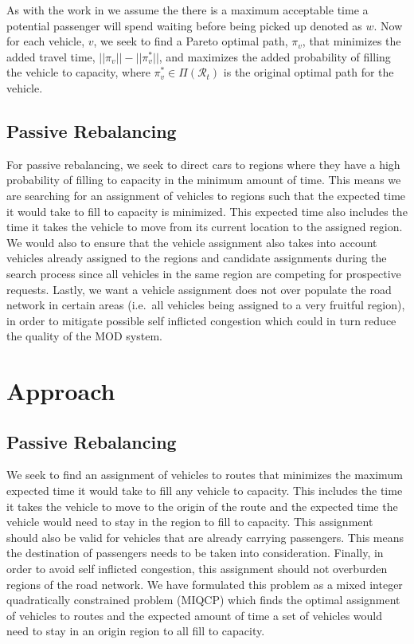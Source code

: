 \documentclass[letterpaper, 10pt, conference]{ieeeconf}
\begin{document}
As with the work in \cite{alonsomora16pnas} we assume the there is a maximum
acceptable time a potential passenger will spend waiting before being picked up
denoted as $w$. Now for each vehicle, $v$, we seek to find a Pareto optimal
path, $\pi_v$, that minimizes the added travel time, $||\pi_v|| - ||\pi_v^*||$,
and maximizes the added probability of filling the vehicle to capacity, where
$\pi_v^* \in \Pi(\mathcal{R}_t)$ is the original optimal path for the vehicle.

\subsection{Passive Rebalancing}

For passive rebalancing, we seek to direct cars to regions where they have a
high probability of filling to capacity in the minimum amount of time. This
means we are searching for an assignment of vehicles to regions such that the
expected time it would take to fill to capacity is minimized. This expected
time also includes the time it takes the vehicle to move from its current
location to the assigned region. We would also to ensure that the vehicle
assignment also takes into account vehicles already assigned to the regions and
candidate assignments during the search process since all vehicles in the same
region are competing for prospective requests. Lastly, we want a vehicle
assignment does not over populate the road network in certain areas (i.e.\ all
vehicles being assigned to a very fruitful region), in order to mitigate
possible self inflicted congestion which could in turn reduce the quality of
the MOD system.

\section{Approach}

\subsection{Passive Rebalancing}

We seek to find an assignment of vehicles to routes that minimizes the maximum
expected time it would take to fill any vehicle to capacity. This includes the
time it takes the vehicle to move to the origin of the route and the expected
time the vehicle would need to stay in the region to fill to capacity.  This
assignment should also be valid for vehicles that are already carrying
passengers. This means the destination of passengers needs to be taken into
consideration. Finally, in order to avoid self inflicted congestion, this
assignment should not overburden regions of the road network.  We have
formulated this problem as a mixed integer quadratically constrained problem
(MIQCP) which finds the optimal assignment of vehicles to routes and the
expected amount of time a set of vehicles would need to stay in an origin
region to all fill to capacity.
\end{document}
